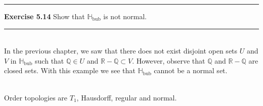 \documentclass[a4paper,12pt,twoside]{hmcpset}
\begin{document}
\noindent\rule{18cm}{1pt}
\noindent
\textbf{Exercise 5.14}
Show that $\mathbb{H}_{\text{bub}}$ is not normal. \\
\noindent\rule{18cm}{1pt}
\\
In the previous chapter, we saw that there does not exist disjoint
open sets $U$ and $V$ in $\mathbb{H}_{\text{bub}}$ such that
$\mathbb{Q} \in U$ and $\mathbb{R} - \mathbb{Q} \subset V$. However,
observe that $\mathbb{Q}$ and $\mathbb{R} - \mathbb{Q}$ are closed
sets. With this example we see that $\mathbb{H}_{\text{bub}}$ cannot
be a normal set. \\
\\
\begin{problem}[Theorem 5.15] Order topologies are $T_1$, Hausdorff,
regular and normal.
\end{problem}
\end{document}
